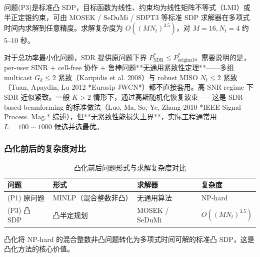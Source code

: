 \begin{theorem}[问题凸性]\label{thm:convex_p3}
问题(P3)是标准凸 SDP，目标函数为线性、约束均为线性矩阵不等式（LMI）或半正定锥约束，可由 MOSEK / SeDuMi / SDPT3 等标准 SDP 求解器在多项式时间内求解到任意精度。求解复杂度为 $O((MN_t)^{3.5})$，对 $M=16, N_t=4$ 约 5--10 秒。
\end{theorem}

\begin{theorem}\label{thm:sdr_tight}
对于总功率最小化问题，SDR 提供原问题下界 $P_{\text{SDR}}^* \leq P_{\text{original}}^*$。需要说明的是，per-user SINR + cell-free 协作 + 鲁棒问题**无通用紧致性定理**——多组 multicast $G_k \leq 2$ 紧致（Karipidis et al. 2008）与 robust MISO $N_t \leq 2$ 紧致（Tuan, Apaydin, Lu 2012 *Eurasip JWCN*）都不直接套用。高 SNR regime 下 SDR 近似紧致。一般 $K>2$ 情形下，通过高斯随机化恢复波束——这是 SDR-based beamforming 的标准做法（Luo, Ma, So, Ye, Zhang 2010 *IEEE Signal Process. Mag.* 综述），但**无紧致性能损失上界**，实际工程通常用 $L = 100 \sim 1000$ 候选并选最优。
\end{theorem}

\subsubsection{凸化前后的复杂度对比}

\begin{table}[htbp]
\centering
\caption{凸化前后问题形式与求解复杂度对比}\label{tab:complexity_compare}
\begin{tabular}{llll}
\toprule
问题 & 形式 & 求解器 & 复杂度 \\
\midrule
(P1) 原问题 & MINLP（混合整数非凸） & 无通用算法 & NP-hard \\
(P3) 凸 SDP & 凸半定规划 & MOSEK / SeDuMi & $O((MN_t)^{3.5})$ \\
\bottomrule
\end{tabular}
\end{table}

凸化将 NP-hard 的混合整数非凸问题转化为多项式时间可解的标准凸 SDP，这是凸化方法的核心价值。
